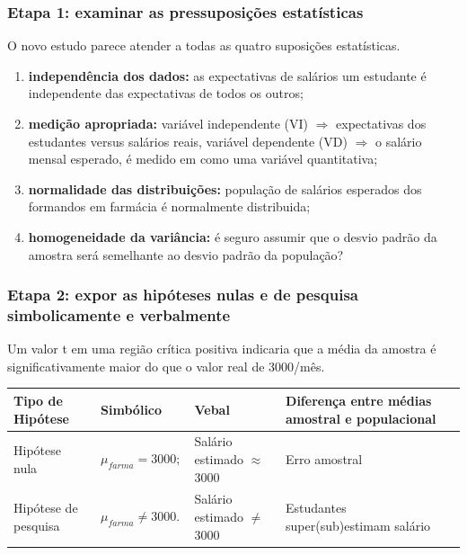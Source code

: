 \documentclass[11pt]{beamer}
\begin{document}
\begin{frame}
\frametitle{Etapa 1: examinar as pressuposições estatísticas}

O novo estudo parece atender a todas as quatro suposições estatísticas.

\begin{enumerate}
\item \textbf{independência dos dados:} as expectativas de salários um estudante é independente das expectativas de todos os outros;
\item \textbf{medição apropriada:} variável independente (VI) \(\Rightarrow\) expectativas dos estudantes versus salários reais, variável dependente (VD) \(\Rightarrow\) o salário mensal esperado, é medido em como uma variável quantitativa;
\item \textbf{normalidade das distribuições:} população de salários esperados dos formandos em farmácia é normalmente distribuida;
\item \textbf{homogeneidade da variância:} é seguro assumir que o desvio padrão da amostra será semelhante ao desvio padrão da população?
\end{enumerate}

\end{frame}

\begin{frame}
\frametitle{Etapa 2: expor as hipóteses nulas e de pesquisa simbolicamente e verbalmente}

Um valor t em uma região crítica positiva indicaria que a média da amostra é significativamente maior do que o valor real de 3000/mês.

\begin{center}
\begin{tabular}{ m{2cm}|m{2cm}|m{3cm}|m{3cm} } 
 \hline
 Tipo de Hipótese & Simbólico & Vebal & Diferença entre médias amostral e populacional\\
  \hline
 Hipótese nula & $\mu_{farma}=3000;$ & Salário estimado $\approx$ 3000 & Erro amostral \\ 
 Hipótese de pesquisa & $\mu_{farma} \neq 3000.$ & Salário estimado $\neq$ 3000 & Estudantes super(sub)estimam salário  \\ 
 \hline
 \hline
\end{tabular}
\end{center}

\end{frame}
\end{document}
